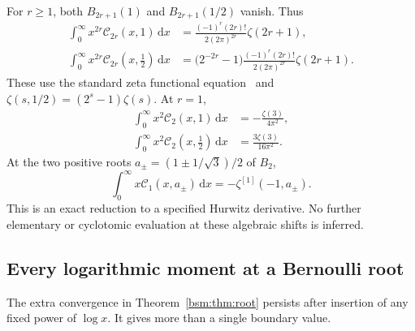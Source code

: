 \documentclass[11pt,letterpaper]{article}
\numberwithin{equation}{section}
\theoremstyle{definition}\newtheorem{definition}[theorem]{Definition}
\theoremstyle{remark}\newtheorem{remark}[theorem]{Remark}
\newcommand{\dd}{\,\mathrm{d}}
\newcommand{\Ccal}{\mathcal C}
\begin{document}
For $r\ge1$, both $B_{2r+1}(1)$ and $B_{2r+1}(1/2)$ vanish. Thus
\begin{align}
 \int_0^\infty x^{2r}\Ccal_{2r}(x,1)\dd x
 &=\frac{(-1)^r(2r)!}{2(2\pi)^{2r}}\zeta(2r+1),
 \label{bsm:eq:odd-one}\\
 \int_0^\infty x^{2r}\Ccal_{2r}(x,\tfrac12)\dd x
 &=\bigl(2^{-2r}-1\bigr)
       \frac{(-1)^r(2r)!}{2(2\pi)^{2r}}\zeta(2r+1).
 \label{bsm:eq:odd-half}
\end{align}
These use the standard zeta functional equation~\cite{DLMFReflection} and
$\zeta(s,1/2)=(2^s-1)\zeta(s)$. At $r=1$,
\begin{align}
 \int_0^\infty x^2\Ccal_2(x,1)\dd x
       &=-\frac{\zeta(3)}{4\pi^2},\label{bsm:eq:odd-first-one}\\
 \int_0^\infty x^2\Ccal_2(x,\tfrac12)\dd x
       &=\frac{3\zeta(3)}{16\pi^2}.\label{bsm:eq:odd-first-half}
\end{align}
At the two positive roots
$a_\pm=(1\pm1/\sqrt3)/2$ of $B_2$,
\begin{equation}\label{bsm:eq:B2-root}
 \int_0^\infty x\Ccal_1(x,a_\pm)\dd x
                  =-\zeta^{[1]}(-1,a_\pm).
\end{equation}
This is an exact reduction to a specified Hurwitz derivative. No
further elementary or cyclotomic evaluation at these algebraic shifts
is inferred.

\subsection{Every logarithmic moment at a Bernoulli root}

The extra convergence in Theorem~\ref{bsm:thm:root} persists after insertion
of any fixed power of $\log x$. It gives more than a single boundary
value.
\end{document}
